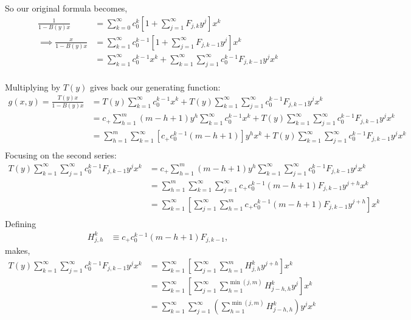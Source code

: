 	So our original formula becomes,
	\begin{align}
		\frac{1}{1-B(y)x} &= \sum_{k=0}^\infty c_0^k  \left[ 1 +  \sum_{j=1}^\infty F_{j, k} y^j\right] x^k \\
		\implies\frac{x}{1-B(y)x} &= \sum_{k=1}^\infty c_0^{k-1}  \left[ 1 +  \sum_{j=1}^\infty F_{j, k-1} y^j\right] x^{k} \\
		&= \sum_{k=1}^\infty c_0^{k-1}x^{k} +  \sum_{k=1}^\infty \sum_{j=1}^\infty c_0^{k-1} F_{j, k-1} y^jx^{k} \\
	\end{align}

	Multiplying by $T(y)$ gives back our generating function:
	\begin{align}
		g(x, y) = \frac{T(y)x}{1-B(y)x} &= T(y)\sum_{k=1}^\infty c_0^{k-1}x^{k} +  T(y)\sum_{k=1}^\infty \sum_{j=1}^\infty c_0^{k-1} F_{j, k-1} y^jx^{k} \\
		&= c_+ \sum_{h=1}^m (m - h + 1)y^h\sum_{k=1}^\infty c_0^{k-1}x^{k} +  T(y)\sum_{k=1}^\infty \sum_{j=1}^\infty c_0^{k-1} F_{j, k-1} y^jx^{k} \\
		&= \sum_{h=1}^m \sum_{k=1}^\infty \left[ c_+ c_0^{k-1}(m - h + 1) \right]y^hx^{k} +  T(y)\sum_{k=1}^\infty \sum_{j=1}^\infty c_0^{k-1} F_{j, k-1} y^jx^{k} \\
	\end{align}
	Focusing on the second series:
	\begin{align}
		T(y)\sum_{k=1}^\infty \sum_{j=1}^\infty c_0^{k-1} F_{j, k-1} y^jx^{k} &= c_+ \sum_{h=1}^m (m - h + 1)y^h\sum_{k=1}^\infty \sum_{j=1}^\infty c_0^{k-1} F_{j, k-1} y^jx^{k}\\
		&=  \sum_{h=1}^m \sum_{k=1}^\infty \sum_{j=1}^\infty c_+c_0^{k-1} (m - h + 1)F_{j, k-1} y^{j+h}x^{k}\\
		&=  \sum_{k=1}^\infty  \left[ \sum_{j=1}^\infty \sum_{h=1}^m c_+c_0^{k-1} (m - h + 1)F_{j, k-1} y^{j+h}\right]x^{k}\\
	\end{align}
	Defining
	\begin{align}
		H_{j, h}^k &\equiv   c_+c_0^{k-1} (m - h + 1)F_{j, k-1},
	\end{align}
	makes,
	\begin{align}
		T(y)\sum_{k=1}^\infty \sum_{j=1}^\infty c_0^{k-1} F_{j, k-1} y^jx^{k} &=  \sum_{k=1}^\infty  \left[ \sum_{j=1}^\infty \sum_{h=1}^m H_{j, h}^k y^{j+h}\right]x^{k}\\
		&=  \sum_{k=1}^\infty  \left[ \sum_{j=1}^\infty \sum_{h=1}^{\min(j, m)} H_{j-h, h}^k y^j\right]x^{k}\\
		&=  \sum_{k=1}^\infty \sum_{j=1}^\infty \left(\sum_{h=1}^{\min(j, m)} H_{j-h, h}^k \right) y^jx^{k}\\
	\end{align}
